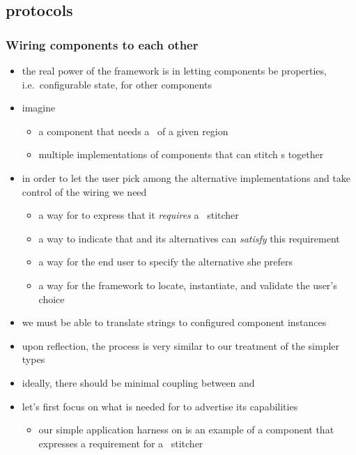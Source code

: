 \subsection{protocols}
\begin{frame}
%
  \frametitle{Wiring components to each other}
%
  \begin{itemize}
%
  \item the real power of the framework is in letting components be properties,
    i.e.~configurable state, for other components
%
  \item imagine
    \begin{itemize}
    \item a component  that needs a \dem\ of a given region
    \item multiple implementations of components that can stitch {\dem}s together
    \end{itemize}
%
  \item in order to let the user pick among the alternative implementations and
    take control of the wiring we need
%
    \begin{itemize}
    \item a way for  to express that it \emph{requires} a \dem\
      stitcher
    \item a way to indicate that  and its alternatives can \emph{satisfy} this
      requirement
    \item a way for the end user to specify the alternative she prefers
    \item a way for the framework to locate, instantiate, and validate the user's choice
    \end{itemize}
%
  \item we must be able to translate strings to configured component instances
%
  \item upon reflection, the process is very similar to our treatment of the simpler types
%
  \item ideally, there should be minimal coupling between  and
%
  \item let's first focus on what is needed for \component{SRTM} to advertise its capabilities
    \begin{itemize}
    \item our simple application harness on  is an example of a
      component that expresses a requirement for a \dem\ stitcher
    \end{itemize}
%
  \end{itemize}
%
\end{frame}

